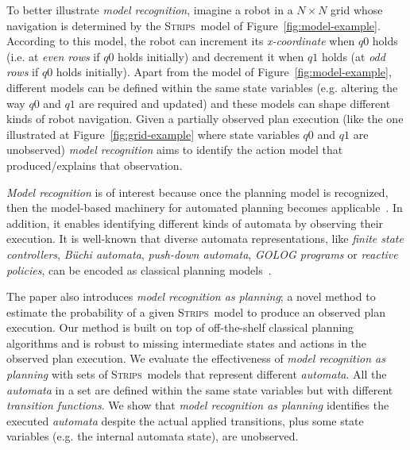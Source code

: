 \documentclass[letterpaper]{article} %
\newcommand{\strips}{\textsc{Strips}}     %
\begin{document}
To better illustrate {\em model recognition}, imagine a robot in a $N\times N$ grid whose navigation is determined by the \strips\ model of Figure~\ref{fig:model-example}. According to this model, the robot can increment its {\em x-coordinate} when {\tt\small $q0$} holds (i.e. at {\em even rows} if {\tt\small $q0$} holds initially) and decrement it when {\tt\small $q1$} holds (at {\em odd rows} if {\tt\small $q0$} holds initially). Apart from the model of Figure~\ref{fig:model-example}, different models can be defined within the same state variables (e.g. altering the way {\tt\small $q0$} and {\tt\small $q1$} are required and updated) and these models can shape different kinds of robot navigation. Given a partially observed plan execution (like the one illustrated at Figure~\ref{fig:grid-example} where state variables {\small\tt $q0$} and {\small\tt $q1$} are unobserved) {\em model recognition} aims to identify the action model that produced/explains that observation.

{\em Model recognition} is of interest because once the planning model is recognized, then the model-based machinery for automated planning becomes applicable~\cite{ghallab2004automated}. In addition, it enables identifying different kinds of automata by observing their execution. It is well-known that diverse automata representations, like {\em finite state controllers}, {\em B\"{u}chi automata}, {\em push-down automata}, {\em {\sc GOLOG} programs} or {\em reactive policies}, can be encoded as classical planning models~\cite{BaierFM07,Geffner:FSM:AAAI10,patrizi2011computing,IvankovicH15,segovia2017generating}.

The paper also introduces {\em model recognition as planning}; a novel method to estimate the probability of a given \strips\ model to produce an observed plan execution. Our method is built on top of off-the-shelf classical planning algorithms and is robust to missing intermediate states and actions in the observed plan execution. We evaluate the effectiveness of {\em model recognition as planning} with sets of \strips\ models that represent different {\em automata}. All the {\em automata} in a set are defined within the same state variables but with different {\em transition functions}. We show that {\em model recognition as planning} identifies the executed {\em automata} despite the actual applied transitions, plus some state variables (e.g. the internal automata state), are unobserved.
\end{document}
